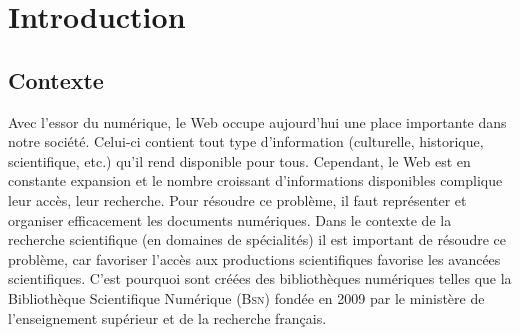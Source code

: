 \chapter{Introduction}
\label{chap:main-introduction}


  \section{Contexte}
  \label{sec:main-introduction-context}
    Avec l'essor du numérique, le Web occupe aujourd'hui une place importante
    dans notre société. Celui-ci contient tout type d'information (culturelle,
    historique, scientifique, etc.) qu'il rend disponible pour tous. Cependant,
    le Web est en constante expansion et le nombre croissant d'informations
    disponibles complique leur accès, leur recherche. Pour résoudre ce problème,
    il faut représenter et organiser efficacement les documents numériques. Dans
    le contexte de la recherche scientifique (en domaines de spécialités) il est
    important de résoudre ce problème, car favoriser l'accès aux productions
    scientifiques favorise les avancées scientifiques. C'est pourquoi sont
    créées des bibliothèques numériques telles que la Bibliothèque Scientifique
    Numérique (\textsc{Bsn}) fondée en 2009 par le ministère de l'enseignement
    supérieur et de la recherche français.

